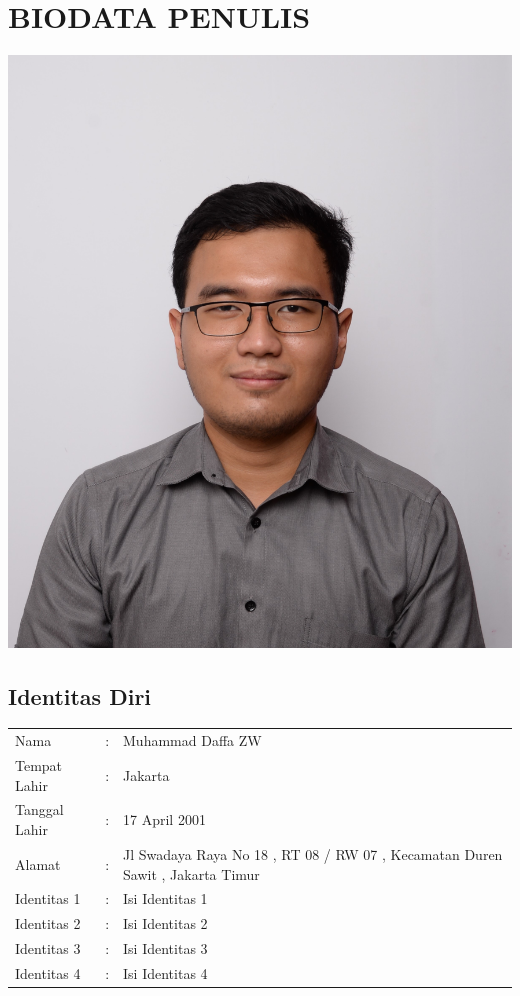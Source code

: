 \chapter*{BIODATA PENULIS}
	\begin{center}
		\includegraphics[width=0.7\linewidth]{gambar/bener/Foto Muhammad Daffa Z3.JPG}
	\end{center}
\section*{Identitas Diri}
\begin{tabular}{p{3cm}cp{9cm}}
	Nama  		  & :&
		Muhammad Daffa ZW \\
	Tempat Lahir  & :&
		Jakarta\\
	Tanggal Lahir &:& 
		17 April 2001\\
	Alamat        &:& 
		Jl Swadaya Raya No 18 , RT 08 / RW 07 , Kecamatan Duren Sawit , Jakarta Timur\\
	Identitas 1   &:&
		 Isi Identitas 1\\
	Identitas 2   &:& 
		Isi Identitas 2\\
	Identitas 3   &:&
		 Isi Identitas 3\\
	Identitas 4   &:&
		 Isi Identitas 4\\
\end{tabular}

